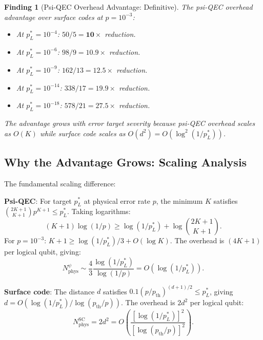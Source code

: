 \documentclass[11pt]{article}
\newtheorem{finding}[theorem]{Finding}
\theoremstyle{definition}
\theoremstyle{remark}
\begin{document}
\begin{finding}[Psi-QEC Overhead Advantage: Definitive]
\label{finding:overhead-definitive}
The psi-QEC overhead advantage over surface codes at $p = 10^{-3}$:
\begin{itemize}
  \item At $p_L^* = 10^{-4}$: $50/5 = \mathbf{10\times}$ reduction.
  \item At $p_L^* = 10^{-6}$: $98/9 = \mathbf{10.9\times}$ reduction.
  \item At $p_L^* = 10^{-9}$: $162/13 = \mathbf{12.5\times}$ reduction.
  \item At $p_L^* = 10^{-14}$: $338/17 = \mathbf{19.9\times}$ reduction.
  \item At $p_L^* = 10^{-18}$: $578/21 = \mathbf{27.5\times}$ reduction.
\end{itemize}
The advantage grows with error target severity because psi-QEC overhead
scales as $O(K)$ while surface code scales as $O(d^2) = O(\log^2(1/p_L^*))$.
\end{finding}

\subsection{Why the Advantage Grows: Scaling Analysis}
\label{sec:scaling-analysis}

The fundamental scaling difference:

\textbf{Psi-QEC}: For target $p_L^*$ at physical error rate $p$, the minimum
$K$ satisfies $\binom{2K+1}{K+1} p^{K+1} \leq p_L^*$.  Taking logarithms:
\begin{equation}
  (K+1)\log(1/p) \geq \log(1/p_L^*) + \log\binom{2K+1}{K+1}.
  \label{eq:psi-K-scaling}
\end{equation}
For $p = 10^{-3}$: $K+1 \geq \log(1/p_L^*) / 3 + O(\log K)$.
The overhead is $(4K+1)$ per logical qubit, giving:
\begin{equation}
  N_{\mathrm{phys}}^{\psi} \sim \frac{4}{3}\frac{\log(1/p_L^*)}{\log(1/p)}
  = O(\log(1/p_L^*)).
  \label{eq:psi-overhead-scaling}
\end{equation}

\textbf{Surface code}: The distance $d$ satisfies
$0.1(p/p_{\mathrm{th}})^{(d+1)/2} \leq p_L^*$, giving
$d = O(\log(1/p_L^*) / \log(p_{\mathrm{th}}/p))$.
The overhead is $2d^2$ per logical qubit:
\begin{equation}
  N_{\mathrm{phys}}^{\mathrm{SC}} = 2d^2
  = O\!\left(\frac{[\log(1/p_L^*)]^2}{[\log(p_{\mathrm{th}}/p)]^2}\right).
  \label{eq:sc-overhead-scaling}
\end{equation}
\end{document}
